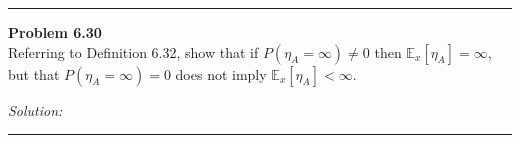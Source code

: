 \documentclass[a4paper, 11pt]{article}
\newenvironment{problem}[2][Problem]
    { \begin{mdframed}[backgroundcolor=gray!20] \textbf{#1 #2} \\}
    {  \end{mdframed}}
\newenvironment{solution}
    {\textit{Solution:}}
    {}
\begin{document}
\noindent\rule{7in}{2.8pt}
\begin{problem}{6.30}
Referring to Definition 6.32, show that if $P\left(\eta_{A}=\infty\right) \neq 0$ then $\mathbb{E}_{x}\left[\eta_{A}\right]=\infty$,
but that $P\left(\eta_{A}=\infty\right)=0$ does not imply $\mathbb{E}_{x}\left[\eta_{A}\right]<\infty$.
\end{problem}
\begin{solution}

\end{solution}
    
\noindent\rule{7in}{2.8pt}
\end{document}
